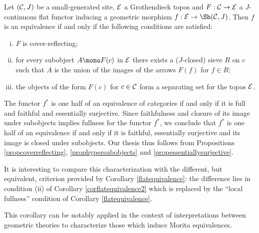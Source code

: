 \documentclass[a4paper,12pt]{article}
\begin{document}
\begin{corollary}\label{corflatequivalence2}
		Let $({\cal C}, J)$ be a small-generated site, $\cal E$ a Grothendieck topos and $F:{\cal C}\to {\cal E}$ a $J$-continuous flat functor inducing a geometric morphism $f:{\cal E}\to \Sh({\cal C}, J)$. Then $f$ is an equivalence if and only if the following conditions are satisfied:
		\begin{enumerate}[(i)]
			\item $F$ is cover-reflecting;
			
			\item for every subobject $A\mono F(c)$ in $\cal E$ there exists a ($J$-closed) sieve $R$ on $c$ such that $A$ is the union of the images of the arrows $F(f)$ for $f\in R$;
			
			\item the objects of the form $F(c)$ for $c\in {\cal C}$ form a separating set for the topos $\cal E$.
		\end{enumerate} 
\end{corollary}

\begin{proofs}
	The functor $f^{\ast}$ is one half of an equivalence of categories if and only if it is full and faithful and essentially surjective. Since faithfulness and closure of its image under subobjects implies fullness for the functor $f^{\ast}$, we conclude that $f^{\ast}$ is one half of an equivalence if and only if it is faithful, essentially surjective and its image is closed under subobjects. Our thesis thus follows from Propositions \ref{propcoverreflecting}, \ref{prophypersubobjects} and \ref{propessentiallysurjective}. 
\end{proofs}

It is interesting to compare this characterization with the different, but equivalent, criterion provided by Corollary \ref{flatequivalence}: the difference lies in condition (ii) of Corollary \ref{corflatequivalence2} which is replaced by the ``local fullness'' condition of Corollary \ref{flatequivalence}.

This corollary can be notably applied in the context of interpretations between geometric theories to characterize those which induce Morita equivalences.  
\end{document}
